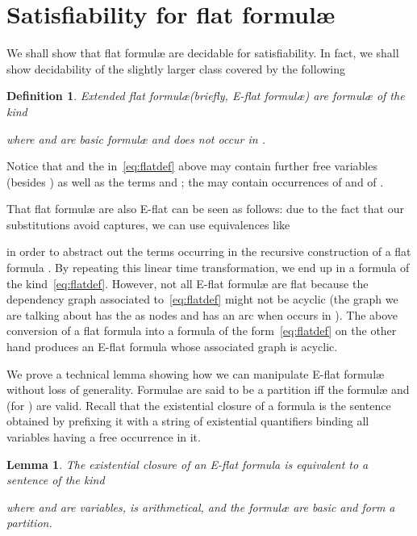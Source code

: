 \documentclass[11pt,a4paper]{article}
\newcommand{\formulae}{formul\ae\xspace}
\newtheorem{definition}{Definition}
\newtheorem{lemma}{Lemma}
\begin{document}
\section{Satisfiability for flat \formulae}\label{sec:sat}

We shall show that flat \formulae are decidable for satisfiability. In fact, we shall show decidability of the slightly
larger class covered by the following

\begin{definition}
Extended flat \formulae (briefly, E-flat \formulae) are \formulae of the kind
   
where  and  are basic \formulae and  does not occur in .
\end{definition}

Notice that 
 and the  in~\eqref{eq:flatdef} above 
may contain
further free variables  (besides ) as well as the terms   and ; the  may contain occurrences of  and of .

 That 
flat \formulae are also E-flat  can be seen 
as follows: due to the fact that our substitutions avoid captures, we can use equivalences like 
   
 in order to abstract out the terms  occurring in the recursive construction of a flat  formula
 . By repeating this  
linear time transformation, we end up in a formula of the kind~\eqref{eq:flatdef}. However, not all E-flat \formulae are flat because
the dependency graph associated to~\eqref{eq:flatdef}  might not be acyclic (the graph we are talking about has the  as nodes and has
an arc  when  occurs in ). The above conversion of a flat formula into a formula of the form~\eqref{eq:flatdef} on the other hand produces an E-flat formula whose associated graph is acyclic.

  
  
  
  
We  prove a technical lemma showing how we can manipulate
E-flat \formulae without loss of generality.
Formulae 
 are said to be a partition iff the \formulae  and  (for )
are valid. Recall that the existential closure of a formula is the sentence obtained by prefixing it with a string of existential quantifiers binding all variables having a free occurrence in it.

\begin{lemma}\label{lemma:nf}
 The existential closure of an E-flat  formula  is equivalent to a sentence of the kind 
 
 where  and  are  variables,  is arithmetical, and the \formulae   are basic and form a partition.\end{lemma}
\end{document}
